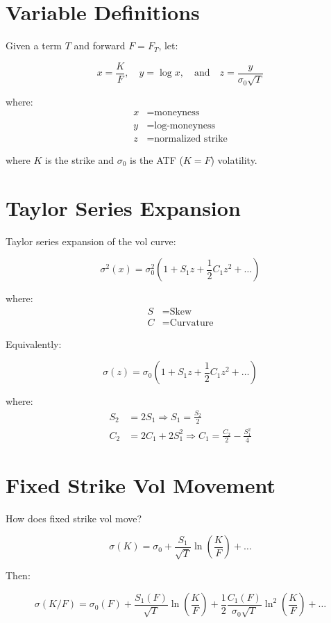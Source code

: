 \documentclass[12pt]{article}
\begin{document}
\section{Variable Definitions}

Given a term $T$ and forward $F=F_T$, let:

\[
x = \frac{K}{F}, \quad y = \log x, \quad \text{and} \quad z = \frac{y}{\sigma_0\sqrt{T}}
\]

where:
\begin{align}
x &= \text{moneyness} \\
y &= \text{log-moneyness} \\
z &= \text{normalized strike}
\end{align}

where $K$ is the strike and $\sigma_0$ is the ATF ($K=F$) volatility.

\section{Taylor Series Expansion}

Taylor series expansion of the vol curve:

\[
\sigma^2(x) = \sigma_0^2\left(1 + S_1 z + \frac{1}{2} C_1 z^2 + \ldots\right)
\]

where:
\begin{align}
S &= \text{Skew} \\
C &= \text{Curvature}
\end{align}

Equivalently:

\[
\sigma(z) = \sigma_0\left(1 + S_1 z + \frac{1}{2} C_1 z^2 + \ldots\right)
\]

where:
\begin{align}
S_2 &= 2S_1 \Rightarrow S_1 = \frac{S_2}{2} \\
C_2 &= 2C_1 + 2S_1^2 \Rightarrow C_1 = \frac{C_2}{2} - \frac{S_1^2}{4}
\end{align}

\section{Fixed Strike Vol Movement}

How does fixed strike vol move?

\[
\sigma(K) = \sigma_0 + \frac{S_1}{\sqrt{T}} \ln\left(\frac{K}{F}\right) + \ldots
\]

Then:

\[
\sigma(K/F) = \sigma_0(F) + \frac{S_1(F)}{\sqrt{T}} \ln\left(\frac{K}{F}\right) + \frac{1}{2} \frac{C_1(F)}{\sigma_0\sqrt{T}} \ln^2\left(\frac{K}{F}\right) + \ldots
\]
\end{document}
